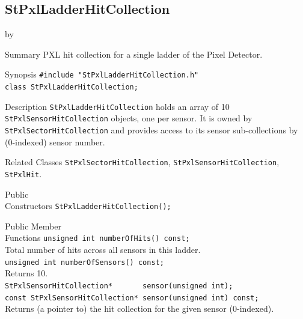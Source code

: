 \documentclass[twoside]{article}
\newcommand{\entrylabel}[1]{\mbox{\textbf{{#1}}}\hfil}%
\newenvironment{entry}
{\begin{list}{}%
    {\renewcommand{\makelabel}{\entrylabel}%
     \setlength{\labelwidth}{90pt}%
     \setlength{\leftmargin}{\labelwidth}
     \advance\leftmargin by \labelsep%
      }%
    }%
  {\end{list}}
\newcommand{\Entrylabel}[1]%
{\raisebox{0pt}[1ex][0pt]{\makebox[\labelwidth][l]%
    {\parbox[t]{\labelwidth}{\hspace{0pt}\textbf{{#1}}}}}}
\newenvironment{Entry}%
{\renewcommand{\entrylabel}{\Entrylabel}\begin{entry}}%
  {\end{entry}}
\begin{document}
\subsection{StPxlLadderHitCollection}
\label{sec:StPxlLadderHitCollection}
\begin{Entry}
\item[Summary] PXL hit collection for a single ladder of the Pixel Detector.
\item[Synopsis]
    \verb+#include "StPxlLadderHitCollection.h"+\\
    \verb+class StPxlLadderHitCollection;+\\
\item[Description]
    \texttt{StPxlLadderHitCollection} holds an array of 10
    \texttt{StPxlSensorHitCollection} objects, one per sensor.  It is owned
    by \texttt{StPxlSectorHitCollection} and provides access to its sensor
    sub-collections by (0-indexed) sensor number.
\item[Related Classes]
    \texttt{StPxlSectorHitCollection}, \texttt{StPxlSensorHitCollection},
    \texttt{StPxlHit}.
\item[Public\\ Constructors]
    \verb+StPxlLadderHitCollection();+\\
\item[Public Member\\ Functions]
    \verb+unsigned int numberOfHits() const;+\\
    Total number of hits across all sensors in this ladder.\\
    \verb+unsigned int numberOfSensors() const;+\\
    Returns 10.\\
    \verb+StPxlSensorHitCollection*       sensor(unsigned int);+\\
    \verb+const StPxlSensorHitCollection* sensor(unsigned int) const;+\\
    Returns (a pointer to) the hit collection for the given sensor (0-indexed).\\
\end{Entry}
\clearpage

\end{document}
